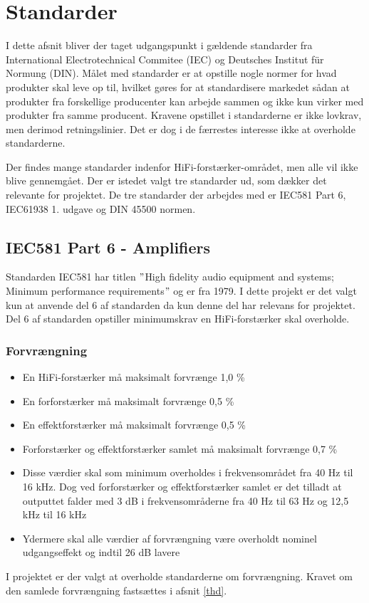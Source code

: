 \section{Standarder}
\label{standarder}
I dette afsnit bliver der taget udgangspunkt i gældende standarder fra International Electrotechnical Commitee (IEC) og Deutsches Institut f\"{u}r Normung (DIN). Målet med standarder er at opstille nogle normer for hvad produkter skal leve op til, hvilket gøres for at standardisere markedet sådan at produkter fra forskellige producenter kan arbejde sammen og ikke kun virker med produkter fra samme producent. Kravene opstillet i standarderne er ikke lovkrav, men derimod retningslinier. Det er dog i de færrestes interesse ikke at overholde standarderne.

Der findes mange standarder indenfor HiFi-forstærker-området, men alle vil ikke blive gennemgået. Der er istedet valgt tre standarder ud, som dækker det relevante for projektet. De tre standarder der arbejdes med er IEC581 Part 6, IEC61938 1. udgave og DIN 45500 normen. 

\subsection*{IEC581 Part 6 - Amplifiers}
\label{IEC581}
Standarden IEC581 har titlen $"$High fidelity audio equipment and systems; Minimum performance requirements$"$ og er fra 1979. I dette projekt er det valgt kun at anvende del 6 af standarden da kun denne del har relevans for projektet. Del 6 af standarden opstiller minimumskrav en HiFi-forstærker skal overholde\cite{IEC581-6}.
\subsubsection*{Forvrængning}
\begin{itemize}
\item En HiFi-forstærker må maksimalt forvrænge 1,0 \%
\item En forforstærker må maksimalt forvrænge 0,5 \%
\item En effektforstærker må maksimalt forvrænge 0,5 \%
\item Forforstærker og effektforstærker samlet må maksimalt forvrænge 0,7 \%
\item Disse værdier skal som minimum overholdes i frekvensområdet fra 40 Hz til 16 kHz. Dog ved forforstærker og effektforstærker samlet er det tilladt at outputtet falder med 3 dB i frekvensområderne fra 40 Hz til 63 Hz og 12,5 kHz til 16 kHz
\item Ydermere skal alle værdier af forvrængning være overholdt nominel udgangseffekt og indtil 26 dB lavere 
\end{itemize}
I projektet er der valgt at overholde standarderne om forvrængning. Kravet om den samlede forvrængning fastsættes i afsnit \ref{thd}. 

